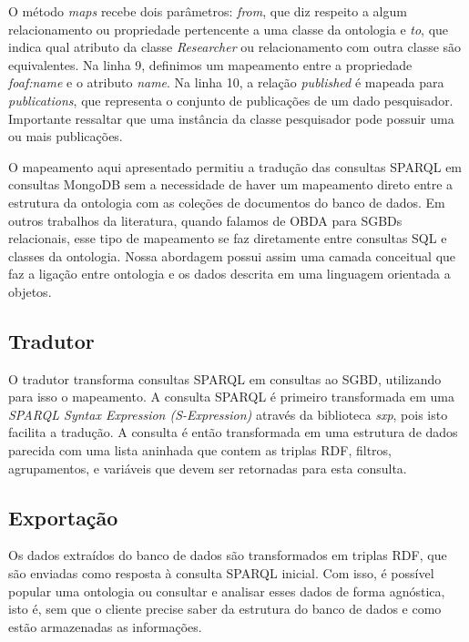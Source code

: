 O método \textit{maps} recebe dois parâmetros: \textit{from}, que diz respeito a
 algum relacionamento ou propriedade pertencente a uma classe da ontologia e
 \textit{to}, que indica qual atributo da classe \textit{Researcher} ou
 relacionamento com outra classe são equivalentes. Na linha 9, definimos um
 mapeamento entre a propriedade \textit{foaf:name} e o atributo \textit{name}.
 Na linha 10, a relação \textit{published} é mapeada para
 \textit{publications}, que representa o conjunto de publicações de um dado
 pesquisador. Importante ressaltar que uma instância da classe pesquisador
 pode possuir uma ou mais publicações.

O mapeamento aqui apresentado permitiu a tradução das consultas SPARQL em
consultas MongoDB sem a necessidade de haver um mapeamento direto entre a
estrutura da ontologia com as coleções de documentos do banco de dados. Em
outros trabalhos da literatura, quando falamos de OBDA para SGBDs relacionais,
esse tipo de mapeamento se faz diretamente entre consultas SQL e classes da
ontologia. Nossa abordagem possui assim uma camada conceitual que faz a ligação
entre ontologia e os dados descrita em uma linguagem orientada a objetos.

\subsection{Tradutor}
O tradutor transforma consultas SPARQL em consultas ao SGBD, utilizando para
isso o mapeamento. A consulta SPARQL é primeiro transformada em uma
\textit{SPARQL Syntax Expression (S-Expression)} através da biblioteca
\textit{sxp}\footnotemark, pois isto facilita a tradução. A consulta é então
transformada em uma estrutura de dados parecida com uma lista aninhada que
contem as triplas RDF, filtros, agrupamentos, e variáveis que devem ser
retornadas para esta consulta.


\subsection{Exportação}
Os dados extraídos do banco de dados são transformados em triplas RDF, que são
enviadas como resposta à consulta SPARQL inicial. Com isso, é possível popular
uma ontologia ou consultar e analisar esses dados de forma agnóstica, isto é,
sem que o cliente precise saber da estrutura do banco de dados e como estão
armazenadas as informações.

